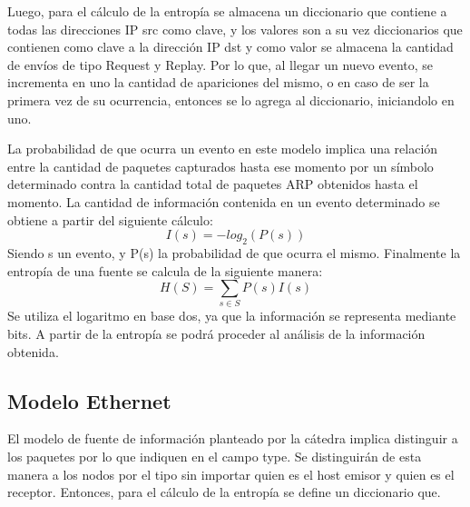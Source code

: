Luego, para el cálculo de la entropía se almacena un diccionario que contiene a todas las direcciones IP src como clave, y los valores son a su vez diccionarios que contienen como clave a la dirección IP dst y como valor se almacena la cantidad de envíos de tipo Request y Replay. Por lo que, al llegar un nuevo evento, se incrementa en uno la cantidad de apariciones del mismo, o en caso de ser la primera vez de su ocurrencia, entonces se lo agrega al diccionario, iniciandolo en uno.

La probabilidad de que ocurra un evento en este modelo implica una relación entre la cantidad de paquetes capturados hasta ese momento por un símbolo determinado contra la cantidad total de paquetes ARP obtenidos hasta el momento. 
La cantidad de información contenida en un evento determinado se obtiene a partir del siguiente cálculo: 
\begin{equation}
 I(s) = -log_{2}(P(s))
\end{equation}
Siendo s un evento, y P(s) la probabilidad de que ocurra el mismo. 
Finalmente la entropía de una fuente se calcula de la siguiente manera: 
\begin{equation}
 H(S) = \sum_{s \in S} P(s) I(s)
\end{equation}
Se utiliza el logaritmo en base dos, ya que la información se representa mediante bits. A partir de la entropía se podrá proceder al análisis de la información obtenida.


\subsection{Modelo Ethernet}
El modelo de fuente de información planteado por la cátedra implica distinguir a los paquetes por lo que indiquen en el campo type. Se distinguirán de esta manera a los nodos por el tipo sin importar quien es el host emisor y quien es el receptor. 
Entonces, para el cálculo de la entropía se define un diccionario que.



